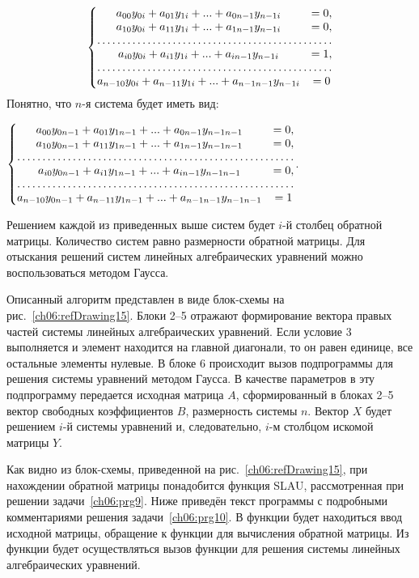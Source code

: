 \begin{equation*}
\left\{\begin{matrix}
a_{00}y_{0i}+a_{01}y_{1i}+...+a_{0n-1}y_{n-1i}&=0,\\
a_{10}y_{0i}+a_{11}y_{1i}+...+a_{1n-1}y_{n-1i}&=0,\\
\hdotsfor{2}\\
a_{i0}y_{0i}+a_{i1}y_{1i}+...+a_{in-1}y_{n-1i}&=1,\\
\hdotsfor{2}\\
a_{n-10}y_{0i}+a_{n-11}y_{1i}+...+a_{n-1n-1}y_{n-1i}&=0
\end{matrix}\right.
\end{equation*}
Понятно, что $n$-я система будет иметь вид:

$\left\{\begin{matrix}
a_{00}y_{0n-1}+a_{01}y_{1n-1}+...+a_{0n-1}y_{n-1n-1}&=0,\\
a_{10}y_{0n-1}+a_{11}y_{1n-1}+...+a_{1n-1}y_{n-1n-1}&=0,\\
\hdotsfor{2}\\
a_{i0}y_{0n-1}+a_{i1}y_{1n-1}+...+a_{in-1}y_{n-1n-1}&=0,\\
\hdotsfor{2}\\
a_{n-10}y_{0n-1}+a_{n-11}y_{1n-1}+...+a_{n-1n-1}y_{n-1n-1}&=1
\end{matrix}\right.$.

Решением каждой из приведенных выше систем будет $i$-й столбец обратной матрицы. Количество систем равно
размерности обратной матрицы. Для отыскания решений систем линейных алгебраических уравнений можно воспользоваться
методом Гаусса. 

Описанный алгоритм представлен в виде блок-схемы на рис.~\ref{ch06:refDrawing15}. Блоки 2–5 отражают формирование
вектора правых частей системы линейных алгебраических уравнений. 
Если условие 3 выполняется и элемент находится на главной диагонали, то он равен единице, все
остальные элементы нулевые. В блоке 6 происходит вызов подпрограммы для решения системы уравнений методом Гаусса. В
качестве параметров в эту подпрограмму передается исходная матрица $A$, сформированный в блоках 2–5 вектор свободных
коэффициентов $B$, размерность системы $n$. Вектор $X$ будет решением $i$-й системы уравнений и, следовательно, $i$-м
столбцом искомой матрицы $Y$.

Как видно из блок-схемы, приведенной на рис.~\ref{ch06:refDrawing15}, при нахождении обратной матрицы понадобится функция
SLAU, рассмотренная при решении задачи~\ref{ch06:prg9}. Ниже приведён текст программы с подробными комментариями решения
задачи~\ref{ch06:prg10}. В функции  будет находиться ввод исходной матрицы, обращение 
к функции  для
вычисления обратной матрицы. Из функции  будет осуществляться вызов функции  
для решения системы линейных
алгебраических уравнений.

